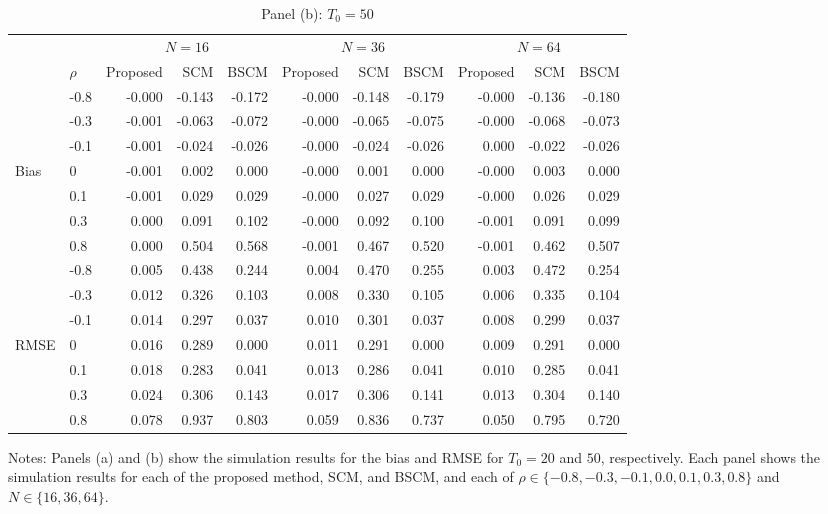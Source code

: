 \begin{table}[H]
\caption*{Panel (b): $T_0=50$}
\label{5.2 Simulation panel b}
\begin{tabular}{llrrrrrrrrr}
\hline
\multicolumn{2}{l}{} & 
\multicolumn{3}{c}{$N=16$} & \multicolumn{3}{c}{$N=36$} & \multicolumn{3}{c}{$N=64$}
 \\
\cmidrule(lr){3-5}\cmidrule(lr){6-8}\cmidrule(lr){9-11}


\multicolumn{1}{l}{} & \multicolumn{1}{l}{$\rho$} & 
Proposed & SCM & BSCM & Proposed & SCM & BSCM & Proposed & SCM & BSCM
 \\ \hline
 & -0.8 & -0.000 & -0.143 & -0.172 & -0.000 & -0.148 & -0.179 & -0.000 & -0.136 & -0.180 \\
& -0.3 & -0.001 & -0.063 & -0.072 & -0.000 & -0.065 & -0.075 & -0.000 & -0.068 & -0.073 \\
& -0.1 & -0.001 & -0.024 & -0.026 & -0.000 & -0.024 & -0.026 & 0.000 & -0.022 & -0.026 \\
Bias & 0 & -0.001 & 0.002 & 0.000 & -0.000 & 0.001 & 0.000 & -0.000 & 0.003 & 0.000 \\
& 0.1 & -0.001 & 0.029 & 0.029 & -0.000 & 0.027 & 0.029 & -0.000 & 0.026 & 0.029 \\
& 0.3 & 0.000 & 0.091 & 0.102 & -0.000 & 0.092 & 0.100 & -0.001 & 0.091 & 0.099 \\
& 0.8 & 0.000 & 0.504 & 0.568 & -0.001 & 0.467 & 0.520 & -0.001 & 0.462 & 0.507 \\
\hdashline
 & -0.8 & 0.005 & 0.438 & 0.244 & 0.004 & 0.470 & 0.255 & 0.003 & 0.472 & 0.254 \\
& -0.3 & 0.012 & 0.326 & 0.103 & 0.008 & 0.330 & 0.105 & 0.006 & 0.335 & 0.104 \\
& -0.1 & 0.014 & 0.297 & 0.037 & 0.010 & 0.301 & 0.037 & 0.008 & 0.299 & 0.037 \\
RMSE & 0 & 0.016 & 0.289 & 0.000 & 0.011 & 0.291 & 0.000 & 0.009 & 0.291 & 0.000 \\
& 0.1 & 0.018 & 0.283 & 0.041 & 0.013 & 0.286 & 0.041 & 0.010 & 0.285 & 0.041 \\
& 0.3 & 0.024 & 0.306 & 0.143 & 0.017 & 0.306 & 0.141 & 0.013 & 0.304 & 0.140 \\
& 0.8 & 0.078 & 0.937 & 0.803 & 0.059 & 0.836 & 0.737 & 0.050 & 0.795 & 0.720 \\
\hline
\end{tabular}

\medskip
\begin{tablenotes}
{\footnotesize
\item Notes: Panels (a) and (b) show the simulation results for the bias and RMSE for $T_0=20$ and $50$, respectively. Each panel shows the simulation results for each of the proposed method, SCM, and BSCM, and each of $\rho \in \{-0.8,-0.3, -0.1, 0.0, 0.1, 0.3,0.8\}$ and $N \in \{16,36,64\}$.
}
\end{tablenotes}
\end{table}

